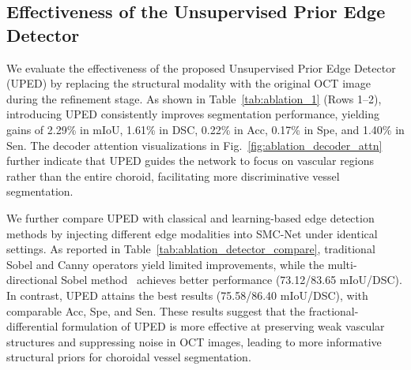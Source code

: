 \documentclass[lettersize,journal]{IEEEtran}
\begin{document}
\begin{table}[h!]
\centering
\caption{Ablation comparison of different edge detection methods on the OCT-CCV dataset using SMC-Net-S for choroidal vessel segmentation. Best results are shown in \textbf{bold}.}
\label{tab:ablation_detector_compare}
\renewcommand{\arraystretch}{1.15}
\end{table}

\subsection{Effectiveness of the Unsupervised Prior Edge Detector}
{\color{red}
We evaluate the effectiveness of the proposed Unsupervised Prior Edge Detector (UPED) by replacing the structural modality with the original OCT image during the refinement stage.
As shown in Table~\ref{tab:ablation_1} (Rows 1--2), introducing UPED consistently improves segmentation performance, yielding gains of 2.29\% in mIoU, 1.61\% in DSC, 0.22\% in Acc, 0.17\% in Spe, and 1.40\% in Sen.
The decoder attention visualizations in Fig.~\ref{fig:ablation_decoder_attn} further indicate that UPED guides the network to focus on vascular regions rather than the entire choroid, facilitating more discriminative vessel segmentation.

We further compare UPED with classical and learning-based edge detection methods by injecting different edge modalities into SMC-Net under identical settings.
As reported in Table~\ref{tab:ablation_detector_compare}, traditional Sobel and Canny operators yield limited improvements, while the multi-directional Sobel method~\cite{dual_encoder_edge} achieves better performance (73.12/83.65 mIoU/DSC).
In contrast, UPED attains the best results (75.58/86.40 mIoU/DSC), with comparable Acc, Spe, and Sen.
These results suggest that the fractional-differential formulation of UPED is more effective at preserving weak vascular structures and suppressing noise in OCT images, leading to more informative structural priors for choroidal vessel segmentation.
}
\end{document}
